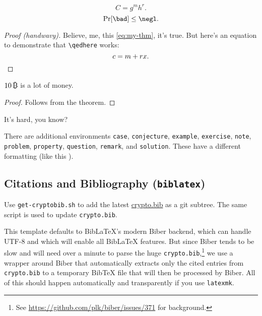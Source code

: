 \begin{theorem}[My Theorem]\label{thm:my-thm}
  \begin{equation}\label{eq:my-thm}
    C = g^mh^r.
  \end{equation}
  \begin{equation}\label{eq:my-thm2}
    \Pr[\bad] \le \negl.
  \end{equation}
\end{theorem}
\begin{proof}[Proof (handwavy)]
  Believe, me, this \cref{eq:my-thm}, it's true.
  But here's an equation to demonstrate that \verb|\qedhere| works:
  \[ c = m+rx . \qedhere \]
\end{proof}

\begin{lemma}\label{thm:a-lemma}
  $10\,\btcsym$ is a lot of money.
\end{lemma}
\begin{proof}
  Follows from the theorem.
\end{proof}

\begin{assumption}\label{ass:very-hard}
  It's hard, you know?
\end{assumption}

\begin{remark}\label{rem:add-env}
  There are additional environments
  \texttt{case}, \texttt{conjecture}, \texttt{example}, \texttt{exercise}, \texttt{note}, \texttt{problem}, \texttt{property}, \texttt{question}, \texttt{remark}, and \texttt{solution}.
  These have a different formatting (like this ).
\end{remark}


\subsection{Citations and Bibliography (\texttt{biblatex})}
Use \texttt{get-cryptobib.sh} to add the latest \href{https://cryptobib.di.ens.fr/}{crypto.bib} as a git subtree.
The same script is used to update \texttt{crypto.bib}.

This template defaults to BibLaTeX's modern Biber backend, which can handle UTF-8 and which will enable all BibLaTeX features.
But since Biber tends to be slow and will need over a minute to parse the huge \texttt{crypto.bib},\footnote{See \url{https://github.com/plk/biber/issues/371} for background.}
we use a wrapper around Biber that automatically extracts only the cited entries from \texttt{crypto.bib} to a temporary BibTeX file that will then be processed by Biber.
All of this should happen automatically and transparently if you use \texttt{latexmk}.

